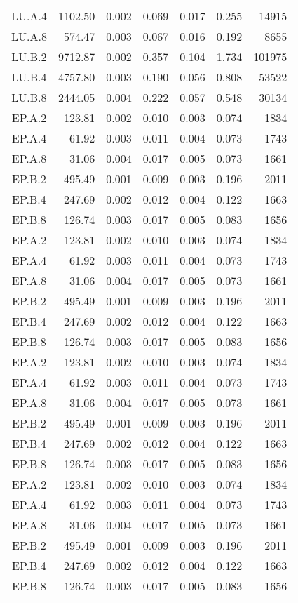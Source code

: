 \begin{longtable}[c]{c*{6}{r}}
  LU.A.4 & 1102.50 & 0.002 & 0.069 & 0.017 & 0.255 & 14915 \\
  LU.A.8 & 574.47 & 0.003 & 0.067 & 0.016 & 0.192 & 8655 \\
  LU.B.2 & 9712.87 & 0.002 & 0.357 & 0.104 & 1.734 & 101975 \\
  LU.B.4 & 4757.80 & 0.003 & 0.190 & 0.056 & 0.808 & 53522 \\
  LU.B.8 & 2444.05 & 0.004 & 0.222 & 0.057 & 0.548 & 30134 \\
  EP.A.2 & 123.81 & 0.002 & 0.010 & 0.003 & 0.074 & 1834 \\
  EP.A.4 & 61.92 & 0.003 & 0.011 & 0.004 & 0.073 & 1743 \\
  EP.A.8 & 31.06 & 0.004 & 0.017 & 0.005 & 0.073 & 1661 \\
  EP.B.2 & 495.49 & 0.001 & 0.009 & 0.003 & 0.196 & 2011 \\
  EP.B.4 & 247.69 & 0.002 & 0.012 & 0.004 & 0.122 & 1663 \\
  EP.B.8 & 126.74 & 0.003 & 0.017 & 0.005 & 0.083 & 1656 \\
  EP.A.2 & 123.81 & 0.002 & 0.010 & 0.003 & 0.074 & 1834 \\
  EP.A.4 & 61.92 & 0.003 & 0.011 & 0.004 & 0.073 & 1743 \\
  EP.A.8 & 31.06 & 0.004 & 0.017 & 0.005 & 0.073 & 1661 \\
  EP.B.2 & 495.49 & 0.001 & 0.009 & 0.003 & 0.196 & 2011 \\
  EP.B.4 & 247.69 & 0.002 & 0.012 & 0.004 & 0.122 & 1663 \\
  EP.B.8 & 126.74 & 0.003 & 0.017 & 0.005 & 0.083 & 1656 \\
  EP.A.2 & 123.81 & 0.002 & 0.010 & 0.003 & 0.074 & 1834 \\
  EP.A.4 & 61.92 & 0.003 & 0.011 & 0.004 & 0.073 & 1743 \\
  EP.A.8 & 31.06 & 0.004 & 0.017 & 0.005 & 0.073 & 1661 \\
  EP.B.2 & 495.49 & 0.001 & 0.009 & 0.003 & 0.196 & 2011 \\
  EP.B.4 & 247.69 & 0.002 & 0.012 & 0.004 & 0.122 & 1663 \\
  EP.B.8 & 126.74 & 0.003 & 0.017 & 0.005 & 0.083 & 1656 \\
  EP.A.2 & 123.81 & 0.002 & 0.010 & 0.003 & 0.074 & 1834 \\
  EP.A.4 & 61.92 & 0.003 & 0.011 & 0.004 & 0.073 & 1743 \\
  EP.A.8 & 31.06 & 0.004 & 0.017 & 0.005 & 0.073 & 1661 \\
  EP.B.2 & 495.49 & 0.001 & 0.009 & 0.003 & 0.196 & 2011 \\
  EP.B.4 & 247.69 & 0.002 & 0.012 & 0.004 & 0.122 & 1663 \\
  EP.B.8 & 126.74 & 0.003 & 0.017 & 0.005 & 0.083 & 1656 \\
  \bottomrule[1.5pt]
\end{longtable}


